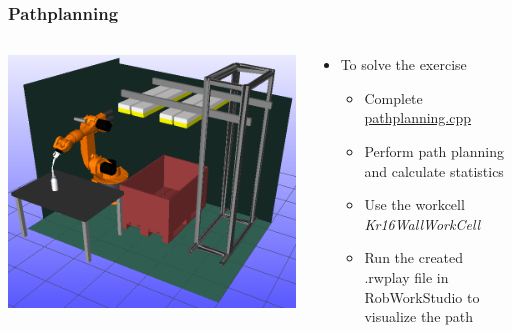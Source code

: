 \documentclass{beamer}
\begin{document}
\begin{frame}
  \frametitle{Pathplanning}
  \begin{columns}
    \begin{column}{0.4\textwidth}
      \begin{center}
        \includegraphics[width=\textwidth]{./mandEx2WC}
      \end{center}
    \end{column}
    \begin{column}{0.6\textwidth}
      \begin{itemize}
      \item To solve the exercise
        \begin{itemize}
        \item Complete \url{pathplanning.cpp}
        \item Perform path planning and calculate statistics
        \item Use the workcell \textit{Kr16WallWorkCell}
        \item Run the created .rwplay file in RobWorkStudio to visualize the path
        \end{itemize}
      \end{itemize}
    \end{column}
  \end{columns}
\end{frame}



\end{document}
